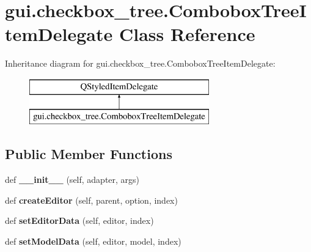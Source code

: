 \hypertarget{classgui_1_1checkbox__tree_1_1_combobox_tree_item_delegate}{}\section{gui.\+checkbox\+\_\+tree.\+Combobox\+Tree\+Item\+Delegate Class Reference}
\label{classgui_1_1checkbox__tree_1_1_combobox_tree_item_delegate}
Inheritance diagram for gui.\+checkbox\+\_\+tree.\+Combobox\+Tree\+Item\+Delegate\+:\begin{figure}[H]
\begin{center}
\leavevmode
\includegraphics[height=2.000000cm]{d2/dbd/classgui_1_1checkbox__tree_1_1_combobox_tree_item_delegate}
\end{center}
\end{figure}
\subsection*{Public Member Functions}
\begin{DoxyCompactItemize}
\item 
\mbox{\label{classgui_1_1checkbox__tree_1_1_combobox_tree_item_delegate_a19eb8ab9e050290b50fd7aa78591711e}} 
def {\bfseries \+\_\+\+\_\+init\+\_\+\+\_\+} (self, adapter, args)
\item 
\mbox{\label{classgui_1_1checkbox__tree_1_1_combobox_tree_item_delegate_ad700d718ca0e97bb3e32bf046912888e}} 
def {\bfseries create\+Editor} (self, parent, option, index)
\item 
\mbox{\label{classgui_1_1checkbox__tree_1_1_combobox_tree_item_delegate_aca8955ada09c57eefdc0221639e48b1e}} 
def {\bfseries set\+Editor\+Data} (self, editor, index)
\item 
\mbox{\label{classgui_1_1checkbox__tree_1_1_combobox_tree_item_delegate_ae7113b9bb126527fc07cf69a216f84f7}} 
def {\bfseries set\+Model\+Data} (self, editor, model, index)
\end{DoxyCompactItemize}
